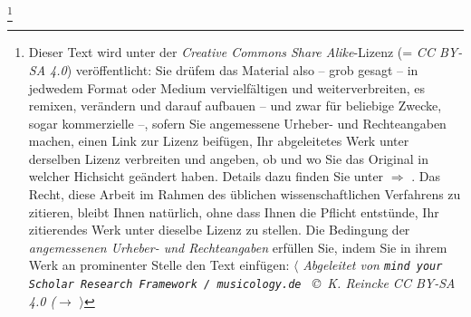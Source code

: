 %
%
%

\footnote{Dieser Text wird unter der \emph{Creative Commons Share Alike}-Lizenz
(= \emph{CC BY-SA 4.0}) veröffentlicht: Sie drüfem das Material also -- grob
gesagt -- in jedwedem Format oder Medium vervielfältigen und weiterverbreiten,
es remixen, verändern und darauf aufbauen -- und zwar für beliebige Zwecke,
sogar kommerzielle --, sofern Sie angemessene Urheber- und Rechteangaben machen,
einen Link zur Lizenz beifügen, Ihr abgeleitetes Werk unter derselben Lizenz
verbreiten und angeben, ob und wo Sie das Original in welcher Hichsicht geändert
haben. Details dazu finden Sie unter $\Rightarrow$
.
Das Recht, diese Arbeit im Rahmen des üblichen wissenschaftlichen Verfahrens zu
zitieren, bleibt Ihnen natürlich, ohne dass Ihnen die Pflicht entstünde, Ihr
zitierendes Werk unter dieselbe Lizenz zu stellen. Die Bedingung der
\emph{an\-ge\-mes\-se\-nen Urheber- und Rechteangaben} erfüllen Sie, indem Sie
in ihrem Werk an prominenter Stelle den Text einfügen: $\langle$ {\itshape
Abgeleitet von \texttt{mind your Scholar Research Framework / musicology.de }
\copyright\ K. Reincke CC BY-SA 4.0 ($\rightarrow$
 }
$\rangle$ }

